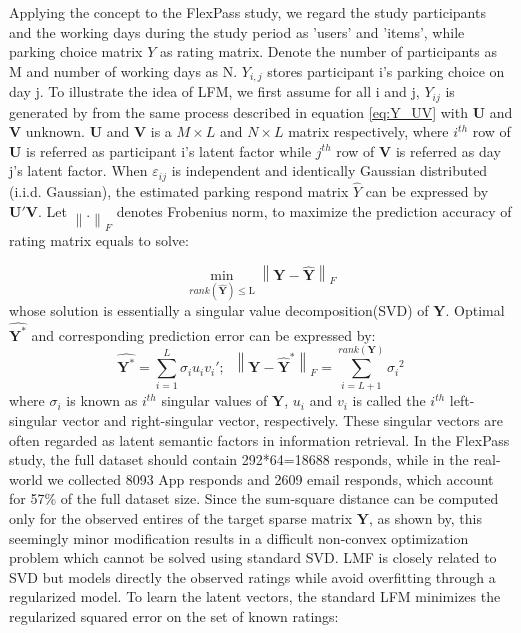 \documentclass[preprint,12pt]{elsarticle}
\begin{document}
Applying the concept to the FlexPass study, we regard the study participants and the working days during the study period as 'users' and 'items', while parking choice matrix $Y$ as rating matrix. Denote the number of participants as M and number of working days as N. $Y_{i,j}$ stores participant i's parking choice on day j. 
To illustrate the idea of LFM, we first assume for all i and j, $Y_{ij}$ is generated by from the same process described in equation \ref{eq:Y_UV} with  $\mathbf{U}$ and $\mathbf{V}$ unknown. $\mathbf{U}$ and $\mathbf{V}$ is a $M\times L$ and $N\times L$ matrix respectively, where $i^{th}$ row of $\mathbf{U}$ is referred as participant i's latent factor while $j^{th}$ row of $\mathbf{V}$ is referred as day j's latent factor. When $\varepsilon _{ij}$ is independent and identically Gaussian distributed (i.i.d. Gaussian), the estimated parking respond matrix $\hat{Y}$ can be expressed by $\mathbf{U}'\mathbf{V}$. Let ${\left\| . \right\|_F}$ denotes Frobenius norm, to maximize the prediction accuracy of rating matrix equals to solve:

\[{\min _{rank(\widehat {\mathbf{Y}}) \leqslant {\text{L}}}}{\left\| {{\mathbf{Y - }}\widehat {\mathbf{Y}}} \right\|_F}\]
whose solution is essentially a singular value decomposition(SVD) of $\mathbf{Y}$. Optimal $\hat{\mathbf{Y^*}}$ and corresponding prediction error can be expressed by:
\[\hat {\mathbf{Y^*}} = \sum\limits_{i = 1}^L {{\sigma _i}{u_i}{v_i}'} ;\;\;{\left\| {{\mathbf{Y - \hat Y^*}}} \right\|_F} = \sum\limits_{i = L + 1}^{rank({\mathbf{Y}})} {{\sigma _i}^2} \]
where $\sigma_i$ is known as $i^{th}$ singular values of $\mathbf{Y}$, $u_i$ and $v_i$ is called the $i^{th}$ left-singular vector and right-singular vector, respectively. These singular vectors are often regarded as latent semantic factors in information retrieval. In the FlexPass study, the full dataset should contain 292*64=18688 responds, while in the real-world we collected 8093 App responds and 2609 email responds, which account for 57$\%$ of the full dataset size. Since the sum-square distance can be computed only for the observed entires of the target sparse matrix $\mathbf{Y}$, as shown by, this seemingly minor modification results in a difficult non-convex optimization problem which cannot be solved using standard SVD. LMF is closely related to SVD but models directly the observed ratings while avoid overfitting through a regularized model. To learn the latent vectors, the standard LFM minimizes the regularized squared error on the set of known ratings:  
\end{document}
